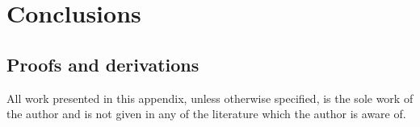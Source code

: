 \documentclass[twoside,notitlepage]{report}
\begin{document}
\chapter{Conclusions}
\newpage{}

\begin{appendix}
\chapter{Proofs and derivations}
All work presented in this appendix, unless otherwise specified, is the sole work
of the author and is not given in any of the literature which the author is aware of.



\cleardoublepage
{}
\thispagestyle{plain}

\end{appendix}
\end{document}
